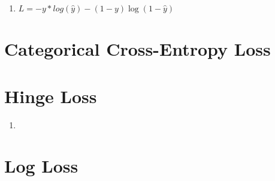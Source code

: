\begin{enumerate}
    \item[]
    $
        L = -y * log(\hat{y}) - (1 - y)  \log(1 - \hat{y})
    $
    \hfill \cite{datacamp/tutorial/loss-function-in-machine-learning}
\end{enumerate}

\section{Categorical Cross-Entropy Loss}

\section{Hinge Loss}

\begin{enumerate}
    \item 
\end{enumerate}


\section{Log Loss}





























